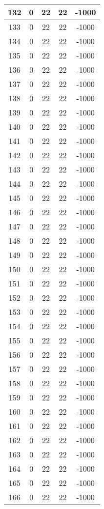 \documentclass[letterpaper, 12pt]{article}
\begin{document}
\begin{longtable}{|c|c|c|c|c|}
\hline
132 & 0 & 22 & 22 & -1000 \\
\hline
133 & 0 & 22 & 22 & -1000 \\
\hline
134 & 0 & 22 & 22 & -1000 \\
\hline
135 & 0 & 22 & 22 & -1000 \\
\hline
136 & 0 & 22 & 22 & -1000 \\
\hline
137 & 0 & 22 & 22 & -1000 \\
\hline
138 & 0 & 22 & 22 & -1000 \\
\hline
139 & 0 & 22 & 22 & -1000 \\
\hline
140 & 0 & 22 & 22 & -1000 \\
\hline
141 & 0 & 22 & 22 & -1000 \\
\hline
142 & 0 & 22 & 22 & -1000 \\
\hline
143 & 0 & 22 & 22 & -1000 \\
\hline
144 & 0 & 22 & 22 & -1000 \\
\hline
145 & 0 & 22 & 22 & -1000 \\
\hline
146 & 0 & 22 & 22 & -1000 \\
\hline
147 & 0 & 22 & 22 & -1000 \\
\hline
148 & 0 & 22 & 22 & -1000 \\
\hline
149 & 0 & 22 & 22 & -1000 \\
\hline
150 & 0 & 22 & 22 & -1000 \\
\hline
151 & 0 & 22 & 22 & -1000 \\
\hline
152 & 0 & 22 & 22 & -1000 \\
\hline
153 & 0 & 22 & 22 & -1000 \\
\hline
154 & 0 & 22 & 22 & -1000 \\
\hline
155 & 0 & 22 & 22 & -1000 \\
\hline
156 & 0 & 22 & 22 & -1000 \\
\hline
157 & 0 & 22 & 22 & -1000 \\
\hline
158 & 0 & 22 & 22 & -1000 \\
\hline
159 & 0 & 22 & 22 & -1000 \\
\hline
160 & 0 & 22 & 22 & -1000 \\
\hline
161 & 0 & 22 & 22 & -1000 \\
\hline
162 & 0 & 22 & 22 & -1000 \\
\hline
163 & 0 & 22 & 22 & -1000 \\
\hline
164 & 0 & 22 & 22 & -1000 \\
\hline
165 & 0 & 22 & 22 & -1000 \\
\hline
166 & 0 & 22 & 22 & -1000 \\

\end{longtable}
\end{document}
